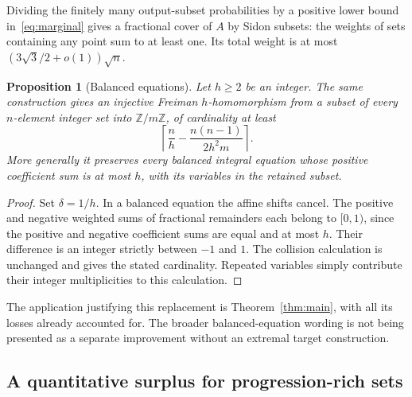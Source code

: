\documentclass[11pt]{article}
\newtheorem{proposition}[theorem]{Proposition}
\theoremstyle{definition}
\theoremstyle{remark}
\newcommand{\Z}{\mathbb Z}
\newcommand{\ceil}[1]{\left\lceil #1\right\rceil}
\begin{document}
Dividing the finitely many output-subset probabilities by a positive
lower bound in~\eqref{eq:marginal} gives a fractional cover of $A$ by
Sidon subsets: the weights of sets containing any point sum to at least
one. Its total weight is at most
$(3\sqrt3/2+o(1))\sqrt n$.

\begin{proposition}[Balanced equations]\label{prop:balanced}
Let $h\ge2$ be an integer. The same construction gives an injective
Freiman $h$-homomorphism from a subset of every $n$-element integer set
into $\Z/m\Z$, of cardinality at least
\[
\ceil{\frac n h-\frac{n(n-1)}{2h^2m}}.
\]
More generally it preserves every balanced integral equation whose
positive coefficient sum is at most $h$, with its variables in the
retained subset.
\end{proposition}
\begin{proof}
Set $\delta=1/h$. In a balanced equation the affine shifts cancel.
The positive and negative weighted sums of fractional remainders each
belong to $[0,1)$, since the positive and negative coefficient sums
are equal and at most $h$. Their difference is an integer strictly
between $-1$ and $1$. The collision calculation is unchanged and gives
the stated cardinality. Repeated variables simply contribute their
integer multiplicities to this calculation.
\end{proof}

The application justifying this replacement is
Theorem~\ref{thm:main}, with all its losses already accounted for.
The broader balanced-equation wording is not being presented as a
separate improvement without an extremal target construction.

\subsection{A quantitative surplus for progression-rich sets}
\end{document}
